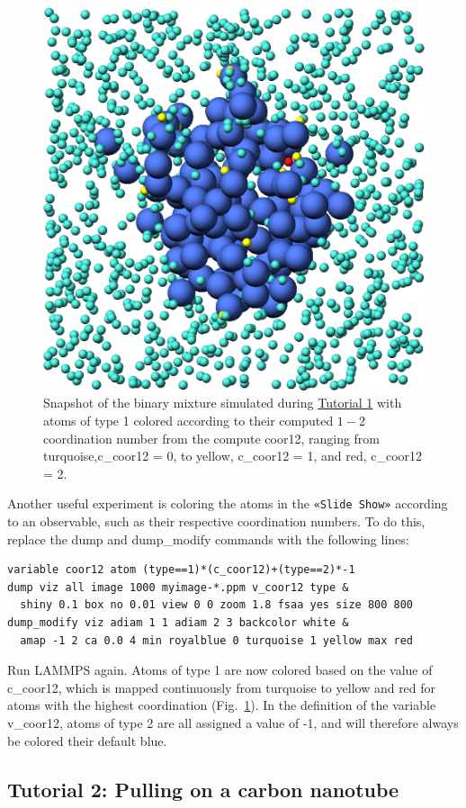 \documentclass[9pt,tutorial]{livecoms}
\newcommand{\lmpcmd}[1]{\hspace{0pt}\colorbox{listing}{\textcolor{command}{\small{#1}}}\hspace{0pt}} %
\newcommand{\guicmd}[1]{\textcolor{command}{\texttt{«#1»}}} %
\begin{document}
\begin{figure}
\centering
\includegraphics[width=0.55\linewidth]{LJ-coords}
\caption{Snapshot of the binary mixture simulated
  during \hyperref[lennard-jones-label]{Tutorial 1} with atoms of type 1
  colored according to their computed $1-2$ coordination
  number from the compute \lmpcmd{coor12}, ranging from turquoise,\lmpcmd{c\_coor12 = 0},
  to yellow, \lmpcmd{c\_coor12 = 1}, and red, \lmpcmd{c\_coor12 = 2}.}
\label{fig:coords-viz}
\end{figure}

Another useful experiment is coloring the atoms in the \guicmd{Slide Show}
according to an observable, such as their respective coordination
numbers.  To do this, replace the
\lmpcmd{dump} and \lmpcmd{dump\_modify} commands with the following lines:
\begin{lstlisting}
variable coor12 atom (type==1)*(c_coor12)+(type==2)*-1
dump viz all image 1000 myimage-*.ppm v_coor12 type &
  shiny 0.1 box no 0.01 view 0 0 zoom 1.8 fsaa yes size 800 800
dump_modify viz adiam 1 1 adiam 2 3 backcolor white &
  amap -1 2 ca 0.0 4 min royalblue 0 turquoise 1 yellow max red
\end{lstlisting}
Run LAMMPS again.  Atoms of type 1 are now colored based on the value
of \lmpcmd{c\_coor12}, which is mapped continuously from turquoise to yellow
and red for atoms with the highest coordination (Fig.~\ref{fig:coords-viz}).
In the definition of the variable \lmpcmd{v\_coor12}, atoms of type 2 are
all assigned a value of -1, and will therefore always be colored their default blue.

\subsection{Tutorial 2: Pulling on a carbon nanotube}
\label{carbon-nanotube-label}
\end{document}
